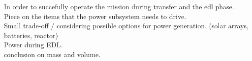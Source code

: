 In order to succefully operate the mission during transfer and the \gls{edl} phase. \\

Piece on the items that the power subsystem needs to drive.\\

Small trade-off / considering possible options for power generation. (solar arrays, batteries, reactor)\\

Power during EDL.\\

conclusion on mass and volume.\\





